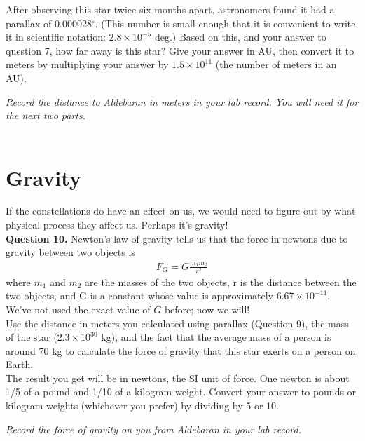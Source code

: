 \documentclass[11pt]{article}
\begin{document}
After observing this star twice six months apart, astronomers found it had a parallax of 0.000028$^\circ$. (This number is small enough that it is convenient to write it in scientific notation: $2.8 \times 10^{-5}$ deg.) Based on this, and your answer to question 7, how far away is this star? Give your answer in AU, then convert it to meters by multiplying your answer by $1.5\times 10^{11}$ (the number of meters in an AU).

\bigskip

{\it Record the distance to Aldebaran in meters in your lab record. You will need it for the next two parts.}\\

\vspace{1.5cm}
\hrulefill\\

\section{Gravity}
If the constellations do have an effect on us, we would need to figure out by what physical process they affect us. Perhaps it's gravity!\\

\textbf{Question 10.} Newton's law of gravity tells us that the force in newtons due to gravity between two objects is
\begin{align*}
F_G=G\frac{m_1 m_2}{r^2}
\end{align*}
where $m_1$ and $m_2$ are the masses of the two objects, r is the distance between the two objects, and G is a constant whose value is approximately $6.67\times 10^{-11}$. We've not used the exact value of $G$ before; now we will!\\

Use the distance in meters you calculated using parallax (Question 9), the mass of the star ($2.3\times 10^{30}$ kg), and the fact that the average mass of a person is around 70 kg to calculate the force of gravity that this star exerts on a person on Earth.\\

The result you get will be in newtons, the SI unit of force. One newton is about 1/5 of a pound and 1/10 of a kilogram-weight. Convert your answer to pounds or kilogram-weights (whichever you prefer) by dividing by 5 or 10. 

\vspace{1em}

{\it Record the force of gravity on you from Aldebaran in your lab record.}
\vspace{2em}
\end{document}
